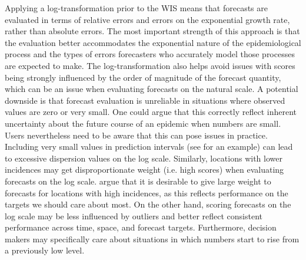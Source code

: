 \documentclass[10pt,letterpaper]{article}
\begin{document}
Applying a log-transformation prior to the WIS means that forecasts are evaluated in terms of relative errors and errors on the exponential growth rate, rather than absolute errors. The most important strength of this approach is that the evaluation better accommodates the exponential nature of the epidemiological process and the types of errors forecasters who accurately model those processes are expected to make. The log-transformation also helps avoid issues with scores being strongly influenced by the order of magnitude of the forecast quantity, which can be an issue when evaluating forecasts on the natural scale. 
A potential downside is that forecast evaluation is unreliable in situations where observed values are zero or very small. One could argue that this correctly reflect inherent uncertainty about the future course of an epidemic when numbers are small. Users nevertheless need to be aware that this can pose issues in practice. Including very small values in prediction intervals (see  for an example) can lead to excessive dispersion values on the log scale. 
Similarly, locations with lower incidences may get disproportionate weight (i.e. high scores) when evaluating forecasts on the log scale. \cite{bracherEvaluatingEpidemicForecasts2021} argue that it is desirable to give large weight to forecasts for locations with high incidences, as this reflects performance on the targets we should care about most. On the other hand, scoring forecasts on the log scale may be less influenced by outliers and better reflect consistent performance across time, space, and forecast targets. Furthermore, decision makers may specifically care about situations in which numbers start to rise from a previously low level.
\end{document}
